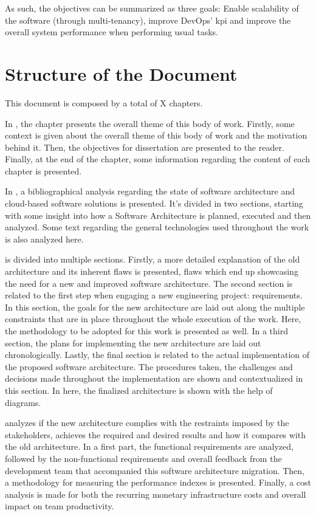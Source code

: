 As such, the objectives can be summarized as three goals: Enable scalability of the software (through multi-tenancy), improve DevOps' \gls{kpi} and improve the overall system performance when performing usual tasks.


\section{Structure of the Document}\label{intro:s:structure-of-the-document}

This document is composed by a total of X chapters.

In , the chapter presents the overall theme of this body of work. Firstly, some context is given about the overall theme of this body of work and the motivation behind it. Then, the objectives for dissertation are presented to the reader. Finally, at the end of the chapter, some information regarding the content of each chapter is presented.

In , a bibliographical analysis regarding the state of software architecture and cloud-based software solutions is presented. It’s divided in two sections, starting with some insight into how a  Software Architecture is planned, executed and then analyzed. Some text regarding the general technologies used throughout the work is also analyzed here.

 is divided into multiple sections. Firstly, a more detailed explanation of the old architecture and its inherent flaws is presented, flaws which end up showcasing the need for a new and improved software architecture. The second section is related to the first step when engaging a new engineering project: requirements. In this section, the goals for the new architecture are laid out along the multiple constraints that are in place throughout the whole execution of the work. Here, the methodology to be adopted for this work is presented as well. In a third section, the plans for implementing the new architecture are laid out chronologically. Lastly, the final section is related to the actual implementation of the proposed software architecture. The procedures taken, the challenges and decisions made throughout the implementation are shown and contextualized in this section. In here, the finalized architecture is shown with the help of diagrams. 

 analyzes if the new architecture complies with the restraints imposed by the stakeholders, achieves the required and desired results and how it compares with the old architecture. In a first part, the functional requirements are analyzed, followed by the non-functional requirements and overall feedback from the development team that accompanied this software architecture migration. Then, a methodology for measuring the performance indexes is presented. Finally, a cost analysis is made for both the recurring monetary infrastructure costs and overall impact on team productivity.

